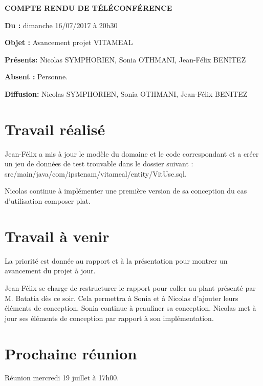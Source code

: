 \documentclass[11pt,a4paper,french,twoside,openright]{article}
\begin{document}
\pagestyle{fancy}

\begin{center}\bfseries\Huge
COMPTE RENDU DE TÉLÉCONFÉRENCE
\end{center}

\textbf{Du      :} dimanche 16/07/2017 à 20h30

\textbf{Objet   :} Avancement projet VITAMEAL

\textbf{Présents:} Nicolas SYMPHORIEN, Sonia OTHMANI, Jean-Félix BENITEZ

\textbf{Absent :} Personne.

\textbf{Diffusion:} Nicolas SYMPHORIEN, Sonia OTHMANI, Jean-Félix BENITEZ

\hrulefill

\section{Travail réalisé}

Jean-Félix a mis à jour le modèle du domaine et le code correspondant et a créer un jeu de données de test trouvable dans le dossier suivant : src/main/java/com/ipstcnam/vitameal/entity/VitUse.sql.

Nicolas continue à implémenter une première version de sa conception du cas d'utilisation composer plat.

\section{Travail à venir}

La priorité est donnée au rapport et à la présentation pour montrer un avancement du projet à jour.

Jean-Félix se charge de restructurer le rapport pour coller au plant présenté par M. Batatia dès ce soir. Cela permettra à Sonia et à Nicolas d'ajouter leurs éléments de conception.
Sonia continue à peaufiner sa conception.
Nicolas met à jour ses éléments de conception par rapport à son implémentation.

\section{Prochaine réunion}
Réunion mercredi 19 juillet à 17h00.
\end{document}
